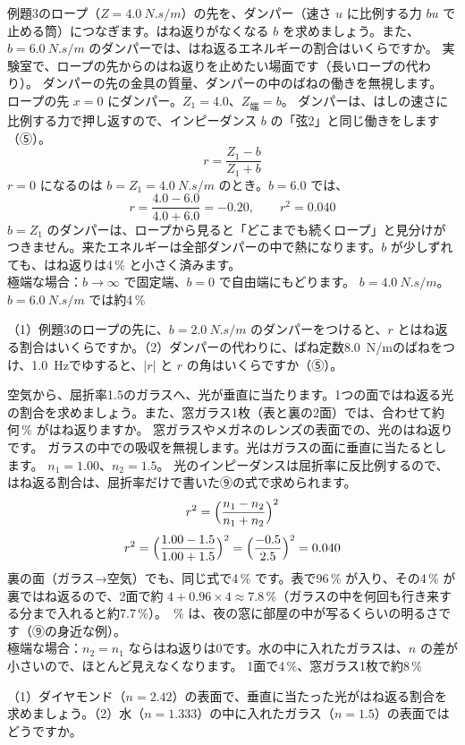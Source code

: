 \label{ph:波-7:ex11}
\begin{phreidai}[はね返らない端を作る]
例題3のロープ（$Z=\qty{4.0}{N.s/m}$）の先を、ダンパー（速さ $u$ に比例する力 $bu$ で止める筒）につなぎます。はね返りがなくなる $b$ を求めましょう。また、$b=\qty{6.0}{N.s/m}$ のダンパーでは、はね返るエネルギーの割合はいくらですか。
\phbamen
実験室で、ロープの先からのはね返りを止めたい場面です（長いロープの代わり）。
\phmushi
ダンパーの先の金具の質量、ダンパーの中のばねの働きを無視します。
\phzu
ロープの先 $x=0$ にダンパー。$Z_1=4.0$、$Z_{\text{端}}=b$。
\phriyu
ダンパーは、はしの速さに比例する力で押し返すので、インピーダンス $b$ の「弦2」と同じ働きをします（⑤）。
\phtateru
\[r=\frac{Z_1-b}{Z_1+b}\]
\phtoku
$r=0$ になるのは $b=Z_1=\qty{4.0}{N.s/m}$ のとき。$b=6.0$ では、
\[r=\frac{4.0-6.0}{4.0+6.0}=-0.20,\qquad r^2=0.040\]
\phtashikame
$b=Z_1$ のダンパーは、ロープから見ると「どこまでも続くロープ」と見分けがつきません。来たエネルギーは全部ダンパーの中で熱になります。$b$ が少しずれても、はね返りは4\,\% と小さく済みます。\\
極端な場合：$b\to\infty$ で固定端、$b=0$ で自由端にもどります。
\kotae $b=\qty{4.0}{N.s/m}$。$b=\qty{6.0}{N.s/m}$ では約4\,\%
\end{phreidai}
\begin{jibun}
（1）例題3のロープの先に、$b=\qty{2.0}{N.s/m}$ のダンパーをつけると、$r$ とはね返る割合はいくらですか。（2）ダンパーの代わりに、ばね定数\qty{8.0}{N/m}のばねをつけ、\qty{1.0}{Hz}でゆすると、$|r|$ と $r$ の角はいくらですか（⑤）。
\end{jibun}

\label{ph:波-7:ex12}
\begin{phreidai}
空気から、屈折率1.5のガラスへ、光が垂直に当たります。1つの面ではね返る光の割合を求めましょう。また、窓ガラス1枚（表と裏の2面）では、合わせて約何\,\% がはね返りますか。
\phbamen
窓ガラスやメガネのレンズの表面での、光のはね返りです。
\phmushi
ガラスの中での吸収を無視します。光はガラスの面に垂直に当たるとします。
\phzu
$n_1=1.00$、$n_2=1.5$。
\phriyu
光のインピーダンスは屈折率に反比例するので、はね返る割合は、屈折率だけで書いた⑨の式で求められます。
\phtateru
\[r^2=\Bigl(\frac{n_1-n_2}{n_1+n_2}\Bigr)^2\]
\phtoku
\[r^2=\Bigl(\frac{1.00-1.5}{1.00+1.5}\Bigr)^2=\Bigl(\frac{-0.5}{2.5}\Bigr)^2=0.040\]
裏の面（ガラス→空気）でも、同じ式で4\,\% です。表で96\,\% が入り、その4\,\% が裏ではね返るので、2面で約 $4+0.96\times4\approx7.8$\,\%（ガラスの中を何回も行き来する分まで入れると約7.7\,\%）。
\,\% は、夜の窓に部屋の中が写るくらいの明るさです（⑨の身近な例）。\\
極端な場合：$n_2=n_1$ ならはね返りは0です。水の中に入れたガラスは、$n$ の差が小さいので、ほとんど見えなくなります。
\kotae 1面で4\,\%、窓ガラス1枚で約8\,\%
\end{phreidai}
\begin{jibun}
（1）ダイヤモンド（$n=2.42$）の表面で、垂直に当たった光がはね返る割合を求めましょう。（2）水（$n=1.333$）の中に入れたガラス（$n=1.5$）の表面ではどうですか。
\end{jibun}

